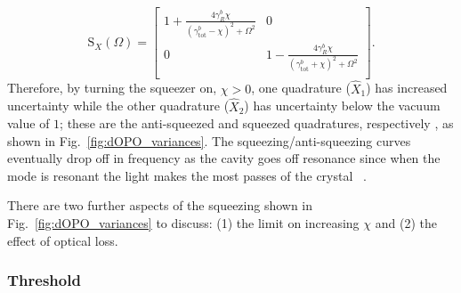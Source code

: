 \begin{equation} \label{eq:dOPO_fixed_phase}
\text{S}_X(\Omega)=\left[
\begin{array}{cc}
 1+\frac{4 \gamma^b_R \chi}{\left({\gamma^b_\text{tot}}-\chi\right)^2+\Omega ^2}
 & 0 \\
 0
 & 1-\frac{4 \gamma^b_R \chi}{\left({\gamma^b_\text{tot}}+\chi\right)^2+\Omega ^2} \\
\end{array}
\right].
\end{equation}
Therefore, by turning the squeezer on, $\chi>0$, one quadrature ($\hat X_1$) has increased uncertainty while the other quadrature ($\hat X_2$) has uncertainty below the vacuum value of $1$; these are the anti-squeezed and squeezed quadratures, respectively , as shown in Fig.~\ref{fig:dOPO_variances}. The squeezing/anti-squeezing curves eventually drop off in frequency  as the cavity goes off resonance since when the mode is resonant the light makes the most passes of the crystal~\cite{} . %

There are two further aspects of the squeezing shown in Fig.~\ref{fig:dOPO_variances} to discuss: (1) the limit on increasing $\chi$ and (2) the effect of optical loss.

\subsubsection{Threshold}
\label{sec:dOPO_threshold}

